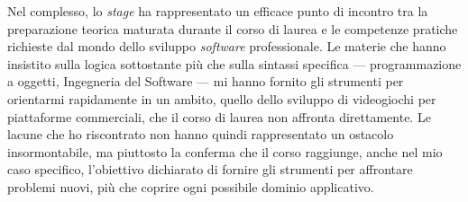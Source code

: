  
Nel complesso, lo \textit{stage} ha rappresentato un efficace punto di incontro tra la preparazione teorica maturata durante il corso di laurea e le competenze pratiche richieste dal mondo dello sviluppo \textit{software} professionale. Le materie che hanno insistito sulla logica sottostante più che sulla sintassi specifica — programmazione a oggetti, Ingegneria del Software — mi hanno fornito gli strumenti per orientarmi rapidamente in un ambito, quello dello sviluppo di videogiochi per piattaforme commerciali, che il corso di laurea non affronta direttamente. Le lacune che ho riscontrato non hanno quindi rappresentato un ostacolo insormontabile, ma piuttosto la conferma che il corso raggiunge, anche nel mio caso specifico, l'obiettivo dichiarato di fornire gli strumenti per affrontare problemi nuovi, più che coprire ogni possibile dominio applicativo.